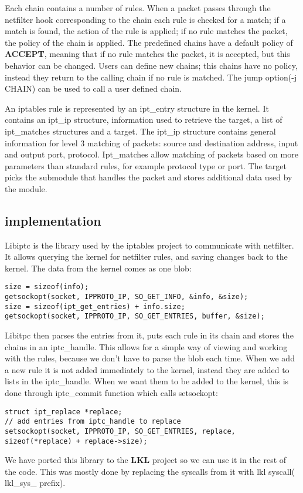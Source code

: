 Each chain contains a number of rules. When a packet passes through the netfilter hook corresponding to the chain each rule is checked
for a match; if a match is found, the action of the rule is applied; if no rule matches the packet, the policy of the chain is applied.
The predefined chains have a default policy of \textbf{ACCEPT}, meaning that if no rule matches the packet, it is accepted, but this behavior
can be changed. Users can define new chains; this chains have no policy, instead they return to the calling chain if no rule is matched.
The jump option(-j CHAIN) can be used to call a user defined chain.

An iptables rule is represented by an ipt_entry structure in the kernel. It contains an ipt_ip structure, information used
to retrieve the target, a list of ipt_matches structures and a target. The ipt_ip structure contains general information for
level 3 matching of packets: source and destination address, input and output port, protocol. Ipt_matches allow matching of
packets based on more parameters than standard rules, for example protocol type or port. The target picks the submodule that 
handles the packet and stores additional data used by the module.

\subsection{\text{\project} implementation}
\label{sub-sec:firewall-lkl}

Libiptc is the library used by the iptables project to communicate with netfilter. It allows
querying the kernel for netfilter rules, and saving changes back to the kernel. The data from
the kernel comes as one blob:
\lstset{language=C,caption=Getting firewall rules,label=lst:sgetrule}
\begin{lstlisting}
size = sizeof(info);
getsockopt(socket, IPPROTO_IP, SO_GET_INFO, &info, &size); 
size = sizeof(ipt_get_entries) + info.size;
getsockopt(socket, IPPROTO_IP, SO_GET_ENTRIES, buffer, &size);
\end{lstlisting}
Libitpc then parses the entries from it, puts each rule in its chain and stores the chains in an iptc_handle. 
This allows for a simple way of viewing and working with the rules, because we don't have to parse the blob 
each time. When we add a new rule it is not added immediately to the kernel, instead they are added to 
lists in the iptc_handle. When we want them to be added to the kernel, this is done through iptc_commit function
which calls setsockopt:
\lstset{language=C,caption=Committing changes,label=lst:ssetrules}
\begin{lstlisting}
struct ipt_replace *replace;
// add entries from iptc_handle to replace
setsockopt(socket, IPPROTO_IP, SO_GET_ENTRIES, replace, sizeof(*replace) + replace->size);
\end{lstlisting}
We have ported this library to the \textbf{LKL} project so we can use it in the rest of the code. This was mostly done by replacing
the syscalls from it with lkl syscall( lkl_sys_ prefix).

